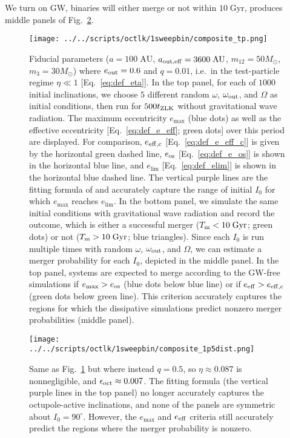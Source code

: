 \documentclass[
        fleqn,
        usenatbib,
    ]{mnras}
\newlength{\colummwidth}
\begin{document}
We turn on GW, binaries will either merge or not within $10\;\mathrm{Gyr}$,
produces middle panels of Fig.~\ref{fig:composites_dist}.
\begin{figure}
    \centering
    \texttt{[image: ../../scripts/octlk/1sweepbin/composite\_tp.png]}
    \caption{Fiducial parameters ($a = 100\;\mathrm{AU}$, $a_{\rm out, eff} =
    3600\;\mathrm{AU}$, $m_{12} = 50M_{\odot}$, $m_3 = 30M_{\odot}$) where
    $e_{\rm out} = 0.6$ and $q = 0.01$, i.e.\ in the test-particle regime
    $\eta \ll 1$ [Eq.~\eqref{eq:def_eta}]. In the top panel, for each of
    $1000$ initial inclinations, we choose $5$ different random $\omega$,
    $\omega_{\rm out}$, and $\Omega$ as initial conditions, then run for
    $500t_{\rm ZLK}$ without gravitational wave radiation. The
    maximum eccentricity $e_{\max}$ (blue dots) as well as the effective
    eccentricity [Eq.~\eqref{eq:def_e_eff}; green dots] over this period are
    displayed. For comparison, $e_{\rm eff, c}$ [Eq.~\eqref{eq:def_e_eff_c}] is
    given by the horizontal green dashed line, $e_{\rm os}$
    [Eq.~\eqref{eq:def_e_os}] is shown in the horizontal blue line, and
    $e_{\lim}$ [Eq.~\eqref{eq:def_elim}] is shown in the horizontal blue dashed
    line. The vertical purple lines are the fitting formula of
    \citet{MLL16} and accurately capture the range of initial $I_0$ for which
    $e_{\max}$ reaches $e_{\lim}$. In the bottom panel, we simulate the same
    initial conditions with gravitational wave radiation and record the
    outcome, which is either a successful merger ($T_{\rm m} <
    10\;\mathrm{Gyr}$; green dots) or not ($T_{\rm m} > 10\;\mathrm{Gyr}$; blue
    triangles). Since each $I_0$ is run multiple times with random $\omega$,
    $\omega_{\rm out}$, and $\Omega$, we can estimate a merger probability for
    each $I_0$, depicted in the middle panel. In the top panel, systems are
    expected to merge according to the GW-free simulations if $e_{\max} >
    e_{\rm os}$ (blue dots below blue line) or if $e_{\rm eff} > e_{\rm eff,
    c}$ (green dots below green line). This criterion accurately captures the
    regions for which the dissipative simulations predict nonzero merger
    probabilities (middle panel).
    }\label{fig:composites_tp}
\end{figure}
\begin{figure}
    \centering
    \texttt{[image: ../../scripts/octlk/1sweepbin/composite\_1p5dist.png]}
    \caption{Same as Fig.~\ref{fig:composites_tp} but where instead $q = 0.5$,
    so $\eta \approx 0.087$ is nonnegligible, and $\epsilon_{\rm oct} \approx
    0.007$. The \citet{MLL16} fitting formula (the vertical purple lines in the
    top panel) no longer accurately captures the octupole-active inclinations,
    and none of the panels are symmetric about $I_0 = 90^\circ$. However, the
    $e_{\max}$ and $e_{\rm eff}$ criteria still accurately predict the regions
    where the merger probability is nonzero. }\label{fig:composites_dist}
\end{figure}
\end{document}
